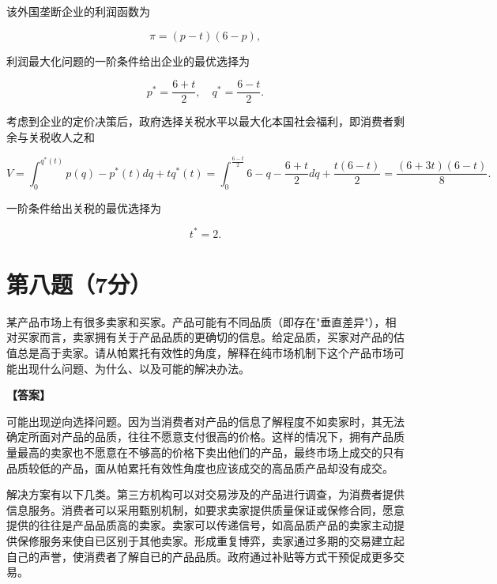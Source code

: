 \documentclass[12pt]{article}
\begin{document}
该外国垄断企业的利润函数为

$$\pi=(p-t)(6-p),$$

利润最大化问题的一阶条件给出企业的最优选择为

$$p^*=\frac{6+t}{2},\quad q^*=\frac{6-t}{2}.$$

考虑到企业的定价决策后，政府选择关税水平以最大化本国社会福利，即消费者剩余与关税收人之和

$$V=\int_{0}^{q^{*}(t)}p(q)-p^{*}(t)dq+tq^{*}(t)=\int_{0}^{\frac{6-t}{2}}6-q-\frac{6+t}{2}dq+\frac{t(6-t)}{2}=\frac{(6+3t)(6-t)}{8}.$$

一阶条件给出关税的最优选择为

$$t^{*}=2.$$

\section*{第八题（7分）}
某产品市场上有很多卖家和买家。产品可能有不同品质（即存在"垂直差异"），相对买家而言，卖家拥有关于产品品质的更确切的信息。给定品质，买家对产品的估值总是高于卖家。请从帕累托有效性的角度，解释在纯市场机制下这个产品市场可能出现什么问题、为什么、以及可能的解决办法。

\noindent\textbf{【答案】}

可能出现逆向选择问题。因为当消费者对产品的信息了解程度不如卖家时，其无法确定所面对产品的品质，往往不愿意支付很高的价格。这样的情况下，拥有产品质量最高的卖家也不愿意在不够高的价格下卖出他们的产品，最终市场上成交的只有品质较低的产品，面从帕累托有效性角度也应该成交的高品质产品却没有成交。

解决方案有以下几类。第三方机构可以对交易涉及的产品进行调查，为消费者提供信息服务。消费者可以采用甄别机制，如要求卖家提供质量保证或保修合同，愿意提供的往往是产品品质高的卖家。卖家可以传递信号，如高品质产品的卖家主动提供保修服务来使自已区别于其他卖家。形成重复博弈，卖家通过多期的交易建立起自己的声誉，使消费者了解自已的产品品质。政府通过补贴等方式干预促成更多交易。
\end{document}
